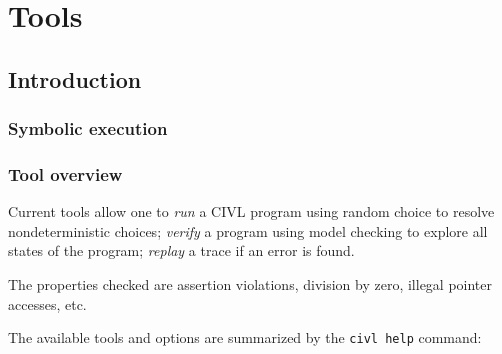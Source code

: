 \part{Tools}
\label{part:tools}

\chapter{Introduction}

\section{Symbolic execution}

\section{Tool overview}

Current tools allow one to \emph{run} a CIVL program using random
choice to resolve nondeterministic choices; \emph{verify} a program
using model checking to explore all states of the program;
\emph{replay} a trace if an error is found.

The properties checked are assertion violations, division by zero,
illegal pointer accesses, etc.

The available tools and options are summarized by the \texttt{civl
  help} command:

